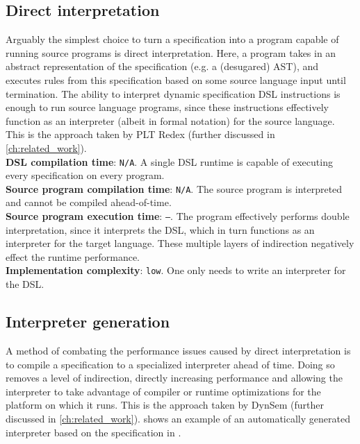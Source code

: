 \subsection{Direct interpretation}
Arguably the simplest choice to turn a specification into a program capable of running source programs is direct interpretation. Here, a program takes in an abstract representation of the specification (e.g. a (desugared) AST), and executes rules from this specification based on some source language input until termination. The ability to interpret dynamic specification \ac{DSL} instructions is enough to run source language programs, since these instructions effectively function as an interpreter (albeit in formal notation) for the source language. This is the approach taken by PLT Redex \cite{MatthewsFFF04} (further discussed in \cref{ch:related_work}).\\

\noindent
\textbf{\ac{DSL} compilation time}: \texttt{N/A}. A single \ac{DSL} runtime is capable of executing every specification on every program.\\
\textbf{Source program compilation time}: \texttt{N/A}. The source program is interpreted and cannot be compiled ahead-of-time.\\
\textbf{Source program execution time}: \texttt{--}. The program effectively performs double interpretation, since it interprets the \ac{DSL}, which in turn functions as an interpreter for the target language. These multiple layers of indirection negatively effect the runtime performance.\\
\textbf{Implementation complexity}: \texttt{low}. One only needs to write an interpreter for the \ac{DSL}.

\subsection{Interpreter generation}
A method of combating the performance issues caused by direct interpretation is to compile a specification to a specialized interpreter ahead of time. Doing so removes a level of indirection, directly increasing performance and allowing the interpreter to take advantage of compiler or runtime optimizations for the platform on which it runs. This is the approach taken by DynSem \cite{VerguNV15} (further discussed in \cref{ch:related_work}).  shows an example of an automatically generated interpreter based on the specification in .\\

